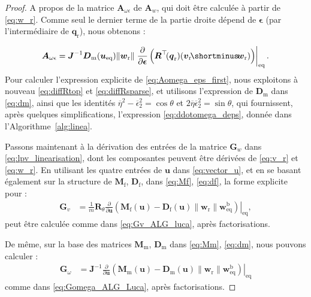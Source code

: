 \begin{proof}
A propos de la matrice $\boldsymbol{A}_{\omega \epsilon}$ de $\boldsymbol{A}_{w}$, qui doit être calculée à partir de \eqref{eq:w_r}. Comme seul le dernier terme de la partie droite dépend de $\boldsymbol{\epsilon}$ (par l'intermédiaire de $\boldsymbol{q}_{\mathrm r}$), nous obtenons :

\begin{align}
\label{eq:Aomega_eps_first}
\boldsymbol{A}_{ \omega \epsilon} =  \boldsymbol{J}^{-1}
\boldsymbol{D}_{\mathrm{m}} (\boldsymbol{u}_{\text{eq}}) \lVert  \boldsymbol{w}_{\mathrm{r}} \rVert 
\left. 
\frac{\partial }{\partial \boldsymbol{\epsilon}} \left( \boldsymbol{R}^\top \!(\boldsymbol{q}_{\mathrm{r}}) (\boldsymbol{v}_{\mathrm{r}} \! \shortminus \! \boldsymbol{w}_{\text{r}}) \right) \right|_{\mathrm{eq}}.
\end{align}
Pour calculer l'expression explicite de \eqref{eq:Aomega_eps_first}, nous exploitons à nouveau \eqref{eq:diffRtop} et \eqref{eq:diffRsparse}, et utilisons l'expression de $\boldsymbol{D}_{\mathrm{m}}$ dans \eqref{eq:dm}, ainsi que les identités $\overline \eta^2 - \overline \epsilon_2^2 = \cos \theta$ et $2\overline \eta \overline \epsilon_2^2 = \sin \theta$, qui fournissent, après quelques simplifications, l'expression \eqref{eq:ddotomega_deps}, donnée dans l'Algorithme~\ref{alg:linea}.

Passons maintenant à la dérivation des entrées de la matrice $\boldsymbol{G}_{w}$ dans \eqref{eq:lpv_linearisation}, dont les composantes peuvent être dérivées de \eqref{eq:v_r} et \eqref{eq:w_r}. En utilisant les quatre entrées de $\boldsymbol{u}$ dans \eqref{eq:vector_u}, et en se basant également sur la structure de $\boldsymbol{M}_{\text{f}}$,
$\boldsymbol{D}_{\text{f}}$, dans \eqref{eq:Mf}, \eqref{eq:df}, la forme explicite pour :
\begin{align}
    \boldsymbol{G}_{v} \! &= \! 
    \frac{1}{m} \boldsymbol{R}_\theta \! \left.\frac{\partial}{\partial \boldsymbol{u}} \! 
     \left( \boldsymbol{M}_{\text{f}}(\boldsymbol{u}) \! - \! \boldsymbol{D}_{\text{f}}(\boldsymbol{u}) \lVert \boldsymbol{w}_{\text{r}} \rVert \boldsymbol{w}^{\text{b}}_{\mathrm{eq}}   \right)\right|_{\mathrm{eq}} ,
\end{align}
peut être calculée comme dans \eqref{eq:Gv_ALG_luca}, après factorisations. 

De même, sur la base des matrices $\boldsymbol{M}_{\text{m}}$, $\boldsymbol{D}_{\text{m}}$ dans \eqref{eq:Mm}, \eqref{eq:dm}, 
nous pouvons calculer : 
\begin{align}
     \boldsymbol{G}_{\omega} \! &= \!  \boldsymbol{J}^{-1} \! \left.\frac{\partial}{\partial \boldsymbol{u}} \! 
     \left( \boldsymbol{M}_{\text{m}}(\boldsymbol{u}) \! - \! \boldsymbol{D}_{\text{m}}(\boldsymbol{u}) \lVert \boldsymbol{w}_{\text{r}} \rVert \boldsymbol{w}^{\text{b}}_{\mathrm{eq}}   \right)\right|_{\mathrm{eq}}
\end{align}
comme dans \eqref{eq:Gomega_ALG_Luca}, après factorisations. 



\end{proof}

